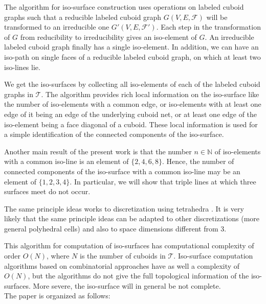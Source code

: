 \documentclass[a4paper,11pt]{article}
\begin{document}
The algorithm for iso-surface construction uses operations on labeled cuboid graphs such
that a reducible labeled cuboid graph $G(V,E,\mathcal{F})$ will be transformed to an irreducible one
$G'(V,E,\mathcal{F}')$. Each step in the transformation of $G$ from reducibility to irreducibility
gives an iso-element of $G$. An irreducible labeled cuboid graph finally has a single iso-element.
In addition, we can have an iso-path on single faces of a reducible labeled cuboid graph, on
which at least two iso-lines lie.

We get the iso-surfaces by collecting all iso-elements of each of the labeled cuboid graphs in
$\mathcal{T}$. The algorithm provides rich local information on the iso-surface like the number of
iso-elements with a common edge, or iso-elements with at least one edge of it being an edge of the
underlying cuboid net, or at least one edge of the iso-element being a face diagonal
of a cuboid. These local information is used for a simple identification of the connected components
of the iso-surface.

Another main result of the present work is that the number $n\in\mathbb{N}$ of iso-elements with a
common iso-line is an element of $\{2,4,6,8\}$. Hence, the number of connected components of the
iso-surface with a common iso-line may be an element of $\{1,2,3,4\}$. In particular, we will show
that triple lines at which three surfaces meet do not occur.

The same principle ideas works to discretization using tetrahedra \cite{second-article-ali-bothe}.
It is very likely that the same principle ideas can be adapted to other discretizations (more
general polyhedral cells) and also to space dimensions different from 3.

This algorithm for computation of iso-surfaces has computational complexity of order $O(N)$, where $N$ is
the number of cuboids in $\mathcal{T}$. Iso-surface computation algorithms based on
combinatorial approaches have as well a complexity of $O(N)$, but the algorithms do not give the full
topological information of the iso-surfaces. More severe, the iso-surface will in general be not complete.\\

\vspace{-0.3cm}
\noindent The paper is organized as follows:\\
\vspace{-0.3cm}
\end{document}
